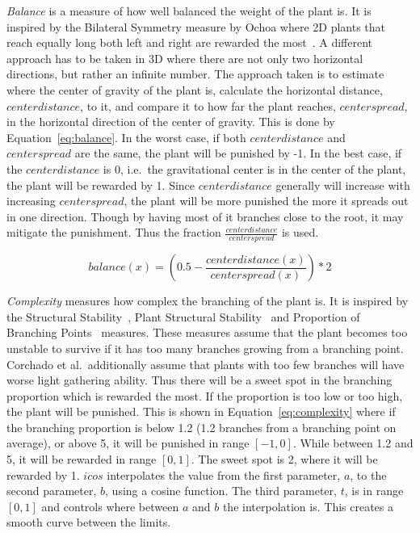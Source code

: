 \textit{Balance} is a measure of how well balanced the weight of the plant is.
It is inspired by the Bilateral Symmetry measure by Ochoa where 2D plants that reach equally long both left and right are rewarded the most~\cite{1998Ochoa}.
A different approach has to be taken in 3D where there are not only two horizontal directions, but rather an infinite number.
The approach taken is to estimate where the center of gravity of the plant is, calculate the horizontal distance, $centerdistance$, to it, and compare it to how far the plant reaches, $centerspread$, in the horizontal direction of the center of gravity.
This is done by Equation~\ref{eq:balance}.
In the worst case, if both $centerdistance$ and $centerspread$ are the same, the plant will be punished by -1.
In the best case, if the $centerdistance$ is 0, i.e.\ the gravitational center is in the center of the plant, the plant will be rewarded by 1.
Since $centerdistance$ generally will increase with increasing $centerspread$, the plant will be more punished the more it spreads out in one direction.
Though by having most of it branches close to the root, it may mitigate the punishment.
Thus the fraction $\frac{centerdistance}{centerspread}$ is used.

\begin{equation}
\label{eq:balance}
balance(x) = (0.5 - \frac{centerdistance(x)}{centerspread(x)}) * 2
\end{equation}

\textit{Complexity} measures how complex the branching of the plant is.
It is inspired by the Structural Stability~\cite{1998Ochoa}, Plant Structural Stability~\cite{2009Corchado} and Proportion of Branching Points~\cite{1998Ochoa} measures.
These measures assume that the plant becomes too unstable to survive if it has too many branches growing from a branching point.
Corchado et al.\ additionally assume that plants with too few branches will have worse light gathering ability.
Thus there will be a sweet spot in the branching proportion which is rewarded the most.
If the proportion is too low or too high, the plant will be punished.
This is shown in Equation~\ref{eq:complexity} where if the branching proportion is below 1.2 (1.2 branches from a branching point on average), or above 5, it will be punished in range $[-1, 0]$.
While between 1.2 and 5, it will be rewarded in range $[0, 1]$.
The sweet spot is 2, where it will be rewarded by 1.
$icos$ interpolates the value from the first parameter, $a$, to the second parameter, $b$, using a cosine function.
The third parameter, $t$, is in range $[0, 1]$ and controls where between $a$ and $b$ the interpolation is.
This creates a smooth curve between the limits.

